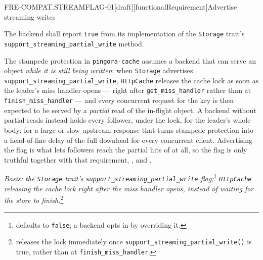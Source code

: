 \begin{requirement}{FRE-COMPAT.STREAMFLAG-01}[draft][functionalRequirement]{Advertise streaming writes}


  The backend shall report \texttt{true} from its implementation of the
  \texttt{Storage} trait's \texttt{support\_streaming\_partial\_write}
  method.

  The stampede protection in \texttt{pingora-cache} assumes a backend that can serve
  an object \emph{while it is still being written}: when \texttt{Storage}
  advertises \texttt{support\_streaming\_partial\_write}, \texttt{HttpCache}
  releases the cache lock as soon as the leader's miss handler opens --- right
  after \texttt{get\_miss\_handler} rather than at
  \texttt{finish\_miss\_handler} --- and every concurrent request for the key
  is then expected to be served by a \emph{partial} read of the in-flight
  object. A backend without partial reads instead holds every follower, under
  the lock, for the leader's whole body; for a large or slow upstream response
  that turns stampede protection into a head-of-line delay of the full
  download for every concurrent client. Advertising the flag is what lets
  followers reach the partial hits of  at all,
  so the flag is only truthful together with that requirement,
  , and .

  \textit{Basis: the \texttt{Storage} trait's
  \texttt{support\_streaming\_partial\_write}
  flag;}\footnote{
  defaults to \texttt{false}; a backend opts in by overriding it.}
  \textit{\texttt{HttpCache} releasing the cache lock right after the miss
  handler opens, instead of waiting for the store to
  finish.}\footnote{
  releases the lock immediately once
  \texttt{support\_streaming\_partial\_write()} is true, rather than at
  \texttt{finish\_miss\_handler}.}



\end{requirement}

